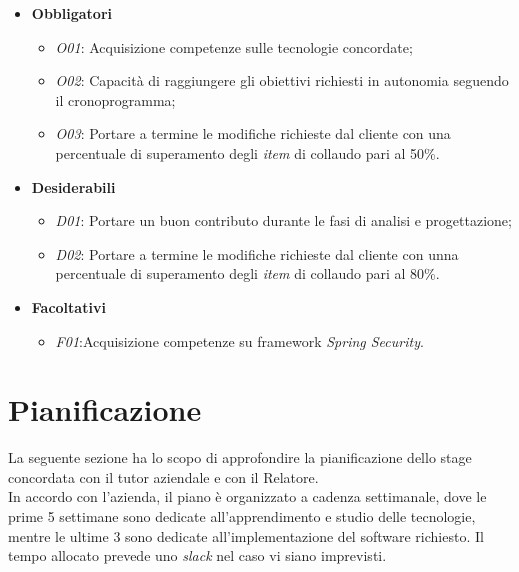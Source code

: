 \begin{itemize}
	\item \textbf{Obbligatori}
	\begin{itemize}
		\item 
		\textit{O01}: Acquisizione competenze sulle tecnologie  concordate;
		\item 
		\textit{O02}: Capacità di raggiungere gli obiettivi richiesti in autonomia seguendo il cronoprogramma;
		\item
		\textit{O03}: Portare a termine le modifiche richieste dal cliente con una percentuale di superamento degli \textit{item} di collaudo pari al 50\%.
		
	\end{itemize}
	\item \textbf{Desiderabili}
	\begin{itemize}
		\item 
		 \textit{D01}: Portare un buon contributo durante le fasi di analisi e progettazione;
		\item 
		 \textit{D02}: Portare a termine le modifiche richieste dal cliente con unna percentuale di superamento degli \textit{item} di collaudo pari al 80\%.
	\end{itemize}
	\item \textbf{Facoltativi}
	\begin{itemize}
		\item \textit{F01}:Acquisizione competenze su \gls{framework} \textit{Spring Security}.
	\end{itemize}
	
\end{itemize}
\section{Pianificazione}
La seguente sezione ha lo scopo di approfondire la pianificazione dello stage concordata con il tutor aziendale e con il Relatore.\\
In accordo con l'azienda, il piano è organizzato a cadenza settimanale, dove le prime 5 settimane sono dedicate all'apprendimento e studio delle tecnologie, mentre le ultime 3 sono dedicate all'implementazione del software richiesto.
Il tempo allocato prevede uno \textit{slack} nel caso vi siano imprevisti.

